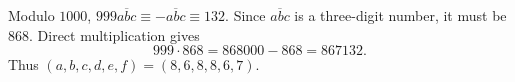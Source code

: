 Modulo $1000$, $999\overline{abc}\equiv-\overline{abc}\equiv132$. Since $\overline{abc}$ is a three-digit number, it must be $868$. Direct multiplication gives
\[
999\cdot868=868000-868=867132.
\]
Thus $\boxed{(a,b,c,d,e,f)=(8,6,8,8,6,7)}$.
